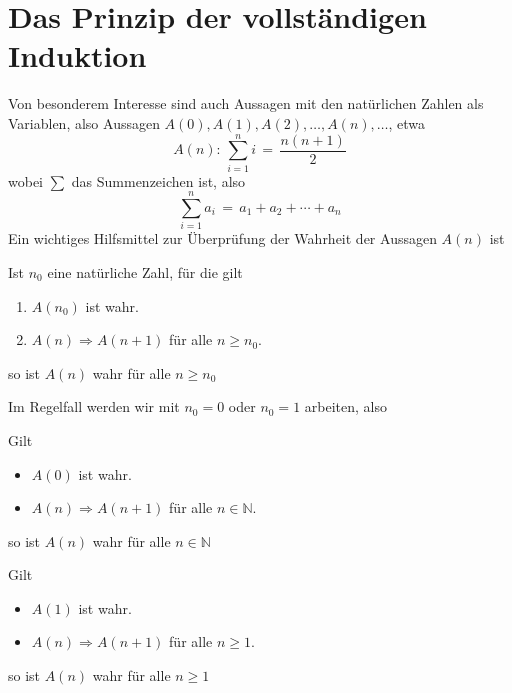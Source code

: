 \section{Das Prinzip der vollständigen Induktion}

Von besonderem Interesse sind auch Aussagen mit den natürlichen Zahlen als Variablen, also Aussagen 
$A(0), A(1), A(2), \ldots, A(n), \ldots$, etwa
  	$$ A(n) : \, \sum_{i=1}^n i \, = \, \frac {n(n+1)}{2} $$
wobei $\sum$ das Summenzeichen ist, also
  	$$ \sum_{i=1}^n a_i \, = \, a_1 + a_2 + \cdots + a_n $$
Ein wichtiges Hilfsmittel zur Überprüfung der Wahrheit der Aussagen $A(n)$ 
ist 

\begin{satz}\label{induktion} 

Ist $n_0$ eine natürliche Zahl, für die gilt

\begin{enumerate}
\item $A(n_0)$ ist wahr.
\item $A(n) \Longrightarrow A(n+1)$ für alle $n \geq n_0$.
\end{enumerate}
so ist $A(n)$ wahr für alle $n \geq n_0$
\end{satz}

Im Regelfall werden wir mit $n_0 = 0$ oder $n_0 = 1$ arbeiten, also

\begin{korollar}

Gilt
\begin{itemize}
\item $A(0)$ ist wahr.
\item $A(n) \Longrightarrow A(n+1)$ für alle $n \in \mathbb N$.
\end{itemize}
so ist $A(n)$ wahr für alle $n \in \mathbb N$

Gilt
\begin{itemize}
\item $A(1)$ ist wahr.
\item $A(n) \Longrightarrow A(n+1)$ für alle $n \geq 1$.
\end{itemize}
so ist $A(n)$ wahr für alle $n \geq 1$
\end{korollar}



